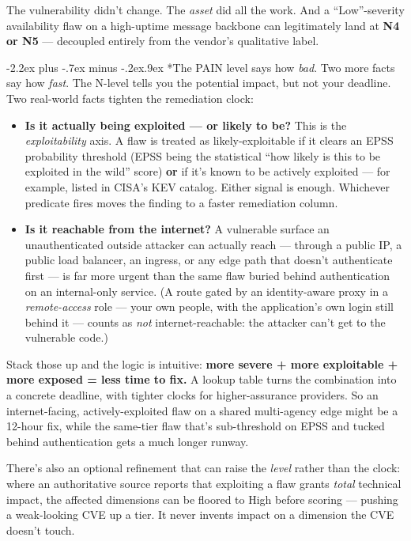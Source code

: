 \documentclass[11pt]{article}
\makeatletter
\renewcommand\section{\@startsection{section}{1}{\z@}%
  {-2.2ex plus -.7ex minus -.2ex}{.9ex}%
  {\normalfont\Large\bfseries}}
\makeatother
\begin{document}
The vulnerability didn't change. The \emph{asset} did all the work. And a
``Low''-severity availability flaw on a high-uptime message backbone can
legitimately land at \textbf{N4 or N5} --- decoupled entirely from the vendor's
qualitative label.

\section*{The PAIN level says how \emph{bad}. Two more facts say how \emph{fast}.}
The N-level tells you the potential impact, but not your deadline. Two real-world
facts tighten the remediation clock:
\begin{itemize}[leftmargin=1.5em]
\item \textbf{Is it actually being exploited --- or likely to be?} This is the
  \emph{exploitability} axis. A flaw is treated as likely-exploitable if it clears
  an EPSS probability threshold (EPSS being the statistical ``how likely is this to
  be exploited in the wild'' score) \textbf{or} if it's known to be actively
  exploited --- for example, listed in CISA's KEV catalog. Either signal is enough.
  Whichever predicate fires moves the finding to a faster remediation column.
\item \textbf{Is it reachable from the internet?} A vulnerable surface an
  unauthenticated outside attacker can actually reach --- through a public IP, a
  public load balancer, an ingress, or any edge path that doesn't authenticate
  first --- is far more urgent than the same flaw buried behind authentication on
  an internal-only service. (A route gated by an identity-aware proxy in a
  \emph{remote-access} role --- your own people, with the application's own login
  still behind it --- counts as \emph{not} internet-reachable: the attacker can't
  get to the vulnerable code.)
\end{itemize}

Stack those up and the logic is intuitive: \textbf{more severe + more exploitable +
more exposed = less time to fix.} A lookup table turns the combination into a
concrete deadline, with tighter clocks for higher-assurance providers. So an
internet-facing, actively-exploited flaw on a shared multi-agency edge might be a
12-hour fix, while the same-tier flaw that's sub-threshold on EPSS and tucked
behind authentication gets a much longer runway.

There's also an optional refinement that can raise the \emph{level} rather than the
clock: where an authoritative source reports that exploiting a flaw grants
\emph{total} technical impact, the affected dimensions can be floored to High
before scoring --- pushing a weak-looking CVE up a tier. It never invents impact on
a dimension the CVE doesn't touch.
\end{document}
